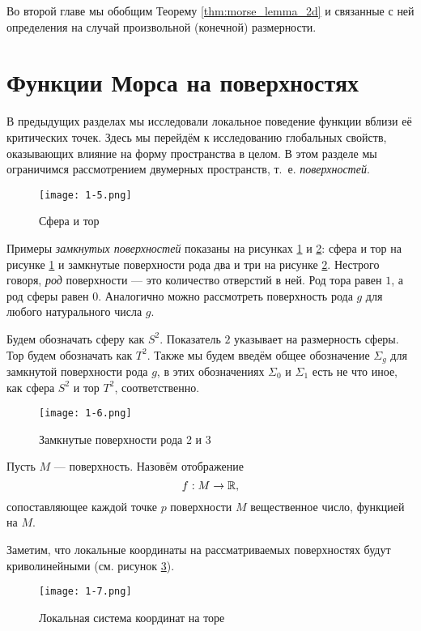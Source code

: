 \documentclass[a4paper,12pt,openany,leqno]{extbook}
\begin{document}
Во второй главе мы обобщим Теорему \ref{thm:morse_lemma_2d} и связанные с ней определения на случай произвольной (конечной) размерности.

\section{Функции Морса на поверхностях}

В предыдущих разделах мы исследовали локальное поведение функции вблизи её критических точек. Здесь мы перейдём к исследованию глобальных свойств, оказывающих влияние на форму пространства в целом. В этом разделе мы ограничимся рассмотрением двумерных пространств, т.~е. \emph{поверхностей}.

\begin{figure}[ht]
\texttt{[image: 1-5.png]}
\caption{Сфера и тор}
\label{fig:sphere_and_torus}
\end{figure}

Примеры \emph{замкнутых поверхностей} показаны на рисунках \ref{fig:sphere_and_torus} и \ref{fig:genus_2_3}: сфера и тор на рисунке \ref{fig:sphere_and_torus} и замкнутые поверхности рода два и три на рисунке \ref{fig:genus_2_3}. Нестрого говоря, \emph{род} поверхности --- это количество отверстий в ней. Род тора равен $1$, а род сферы равен $0$. Аналогично можно рассмотреть поверхность рода $g$ для любого натурального числа $g$.

Будем обозначать сферу как $S^2$. Показатель $2$ указывает на размерность сферы. Тор будем обозначать как $T^2$. Также мы будем введём общее обозначение $\Sigma_g$ для замкнутой поверхности рода $g$, в этих обозначениях $\Sigma_0$ и $\Sigma_1$ есть не что иное, как сфера $S^2$ и тор $T^2$, соответственно.

\begin{figure}[ht]
\texttt{[image: 1-6.png]}
\caption{Замкнутые поверхности рода 2 и 3}
\label{fig:genus_2_3}
\end{figure}

Пусть $M$ --- поверхность. Назовём отображение
\[
f:M \to \mathbb{R},
\]
сопоставляющее каждой точке $p$ поверхности $M$ вещественное число, функцией на $M$.

Заметим, что локальные координаты на рассматриваемых поверхностях будут криволинейными (см. рисунок \ref{fig:surface_local_coords}).

\begin{figure}[ht]
\texttt{[image: 1-7.png]}
\caption{Локальная система координат на торе}
\label{fig:surface_local_coords}
\end{figure}
\end{document}
